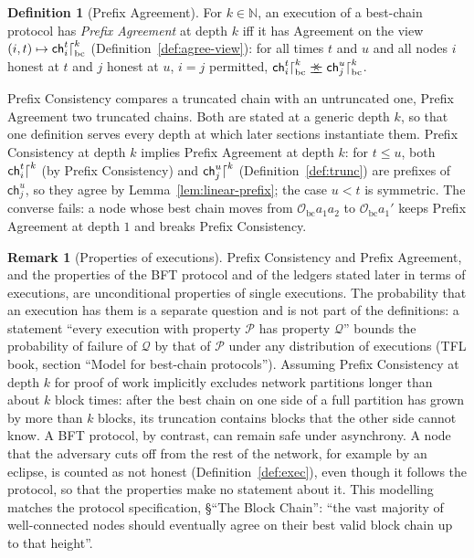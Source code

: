 \documentclass[11pt,a4paper]{article}
\theoremstyle{definition}
\newtheorem{definition}[theorem]{Definition}
\newtheorem{remark}[theorem]{Remark}
\newcommand{\N}{\mathbb{N}}
\newcommand{\bc}{\mathrm{bc}}
\newcommand{\Origin}{\mathcal{O}}
\newcommand{\Obc}{\Origin_{\bc}}
\newcommand{\agrees}{\mathrel{\preceq\mkern-9mu\succeq}}
\newcommand{\ch}{\mathsf{ch}}
\begin{document}
\begin{definition}[Prefix Agreement]\label{def:pa}
For $k \in \N$, an execution of a best-chain protocol has \emph{Prefix
Agreement} at depth $k$ iff it has Agreement on the view
$(i, t) \mapsto \ch_i^t\trunc[\bc]{k}$ (Definition~\ref{def:agree-view}):
for all times $t$ and $u$ and all nodes $i$ honest at $t$ and $j$ honest at
$u$, $i = j$ permitted, $\ch_i^t\trunc[\bc]{k} \agrees \ch_j^u\trunc[\bc]{k}$.
\end{definition}

Prefix Consistency compares a truncated chain with an untruncated one,
Prefix Agreement two truncated chains. Both are stated at a generic depth
$k$, so that one definition serves every depth at which later sections
instantiate them. Prefix Consistency at depth $k$ implies Prefix Agreement at
depth $k$: for $t \le u$, both $\ch_i^t\trunc{k}$ (by Prefix Consistency)
and $\ch_j^u\trunc{k}$ (Definition~\ref{def:trunc}) are prefixes of
$\ch_j^u$, so they agree by Lemma~\ref{lem:linear-prefix}; the case $u < t$
is symmetric. The converse fails: a node whose best chain moves from
$\Obc a_1 a_2$ to $\Obc a_1'$ keeps Prefix Agreement at depth $1$ and breaks
Prefix Consistency.

\begin{remark}[Properties of executions]\label{rem:exec-props}
Prefix Consistency and Prefix Agreement, and the properties of the BFT
protocol and of the ledgers stated later in terms of executions, are
unconditional properties of single executions. The probability that an
execution has them is a separate question and is not part of the
definitions: a statement ``every execution with property $\mathcal{P}$ has
property $\mathcal{Q}$'' bounds the probability of failure of $\mathcal{Q}$
by that of $\mathcal{P}$ under any distribution of executions (TFL book,
section ``Model for best-chain protocols''). Assuming Prefix Consistency at
depth $k$ for proof of work implicitly excludes network partitions longer
than about $k$ block times: after the best chain on one side of a full
partition has grown by more than $k$ blocks, its truncation contains blocks
that the other side cannot know. A BFT protocol, by contrast, can remain safe
under asynchrony. A node that the adversary cuts off from the rest of the
network, for example by an eclipse, is counted as not honest
(Definition~\ref{def:exec}), even though it follows the protocol, so that the
properties make no statement about it.
This modelling matches the protocol specification, \S``The Block Chain'':
``the vast majority of well-connected nodes should eventually agree on their
best valid block chain up to that height''.
\end{remark}
\end{document}
